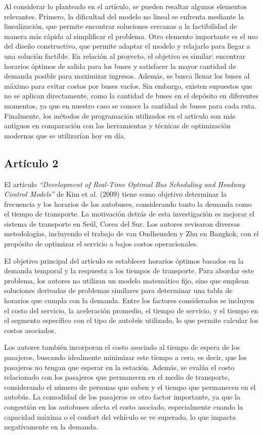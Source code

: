 \documentclass[preprint,11pt]{elsarticle}
\begin{document}
Al considerar lo planteado en el artículo, se pueden resaltar algunos elementos relevantes. Primero, la dificultad del modelo no lineal se enfrenta mediante la linealización, que permite encontrar soluciones cercanas a la factibilidad de manera más rápida al simplificar el problema. Otro elemento importante es el uso del diseño constructivo, que permite adaptar el modelo y relajarlo para llegar a una solución factible. En relación al proyecto, el objetivo es similar: encontrar horarios óptimos de salida para los buses y satisfacer la mayor cantidad de demanda posible para maximizar ingresos. Además, se busca llenar los buses al máximo para evitar costos por buses vacíos. Sin embargo, existen supuestos que no se aplican directamente, como la cantidad de buses en el depósito en diferentes momentos, ya que en nuestro caso se conoce la cantidad de buses para cada ruta. Finalmente, los métodos de programación utilizados en el artículo son más antiguos en comparación con las herramientas y técnicas de optimización modernas que se utilizarían hoy en día.

\subsection*{Artículo 2}

El artículo \textit{“Development of Real-Time Optimal Bus Scheduling and Headway Control Models”} de Kim et al. (2009) \parencite{kim2009} tiene como objetivo determinar la frecuencia y los horarios de los autobuses, considerando tanto la demanda como el tiempo de transporte. La motivación detrás de esta investigación es mejorar el sistema de transporte en Seúl, Corea del Sur. Los autores revisaron diversas metodologías, incluyendo el trabajo de van Oudheusden y Zhu en Bangkok, con el propósito de optimizar el servicio a bajos costos operacionales.

El objetivo principal del artículo es establecer horarios óptimos basados en la demanda temporal y la respuesta a los tiempos de transporte. Para abordar este problema, los autores no utilizan un modelo matemático fijo, sino que emplean soluciones derivadas de problemas similares para determinar una tabla de horarios que cumpla con la demanda. Entre los factores considerados se incluyen el costo del servicio, la aceleración promedio, el tiempo de servicio, y el tiempo en el segmento específico con el tipo de autobús utilizado, lo que permite calcular los costos asociados.

Los autores también incorporan el costo asociado al tiempo de espera de los pasajeros, buscando idealmente minimizar este tiempo a cero, es decir, que los pasajeros no tengan que esperar en la estación. Además, se evalúa el costo relacionado con los pasajeros que permanecen en el medio de transporte, considerando el número de personas que suben y el tiempo que permanecen en el autobús. La comodidad de los pasajeros es otro factor importante, ya que la congestión en los autobuses afecta el costo asociado, especialmente cuando la capacidad máxima o el confort del vehículo se ve superado, lo que impacta negativamente en la demanda.
\end{document}
